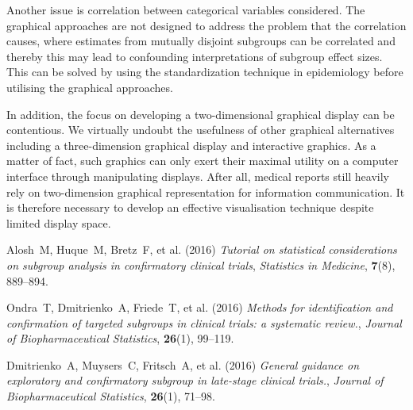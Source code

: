 \documentclass[Afour,sagev,times, doublespace]{sagej}
\begin{document}
{Another issue is correlation between categorical variables considered. The graphical approaches are not designed to address the problem that the correlation causes, where estimates from mutually disjoint subgroups can be correlated and thereby this may lead to confounding interpretations of subgroup effect sizes. This can be solved by using the standardization technique \cite{Varadhan:14} in epidemiology before utilising the graphical approaches. %

In addition, the focus on developing a two-dimensional graphical display can be contentious. We virtually undoubt the usefulness of other graphical alternatives including a three-dimension graphical display and interactive graphics. As a matter of fact, such graphics can only exert their maximal utility on a computer interface through manipulating displays. After all, medical reports still heavily rely on two-dimension graphical representation for information communication. It is therefore necessary to develop an effective visualisation technique despite limited display space.     %

\begin{acks}
\end{acks}

\begin{thebibliography}{99}

		Alosh~M, Huque~M, Bretz~F, et al. (2016)
		\textit{Tutorial on statistical considerations on subgroup analysis in confirmatory clinical trials},
		\newblock \emph{Statistics in Medicine}, \textbf{7}(8), 889--894.	

		Ondra~T, Dmitrienko~A, Friede~T, et al. (2016)
		\textit{Methods for identification and confirmation of targeted subgroups in clinical trials: a systematic review.},
		\newblock \emph{Journal of Biopharmaceutical Statistics}, \textbf{26}(1), 99--119.	

		Dmitrienko~A, Muysers~C, Fritsch~A, et al. (2016)
		\textit{General guidance on exploratory and confirmatory subgroup in late-stage clinical trials.},
		\newblock \emph{Journal of Biopharmaceutical Statistics}, \textbf{26}(1), 71--98.	


\end{thebibliography}}
\end{document}
